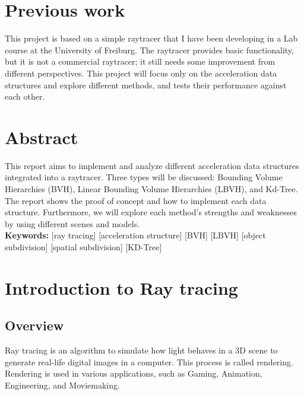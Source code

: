 \documentclass[11pt,a4paper]{article}
\begin{document}
\section*{Previous work}
This project is based on a simple raytracer that I have been developing in a Lab course at the University of Freiburg. The raytracer provides basic functionality, but it is not a commercial raytracer; it still needs some improvement from different perspectives. This project will focus only on the acceleration data structures and explore different methods, and tests their performance against each other.
\\
\section*{Abstract}
This report aims to implement and analyze different acceleration data structures integrated into a raytracer. Three types will be discussed: Bounding Volume Hierarchies (BVH), Linear Bounding Volume Hierarchies (LBVH), and Kd-Tree. The report shows the proof of concept and how to implement each data structure. Furthermore, we will explore each method's strengths and weaknesses by using different scenes and models. 
\\
\textbf{Keywords:} [ray tracing] [acceleration structure] [BVH] [LBVH] [object subdivision] [spatial
subdivision] [KD-Tree]
\clearpage
\tableofcontents
\clearpage



\section{Introduction to Ray tracing}
\subsection{Overview}
Ray tracing is an algorithm to simulate how light behaves in a 3D scene to generate real-life digital images in a computer. This process is called rendering. Rendering is used in various applications, such as Gaming, Animation, Engineering, and Moviemaking. 
\\
\noindent
\end{document}
